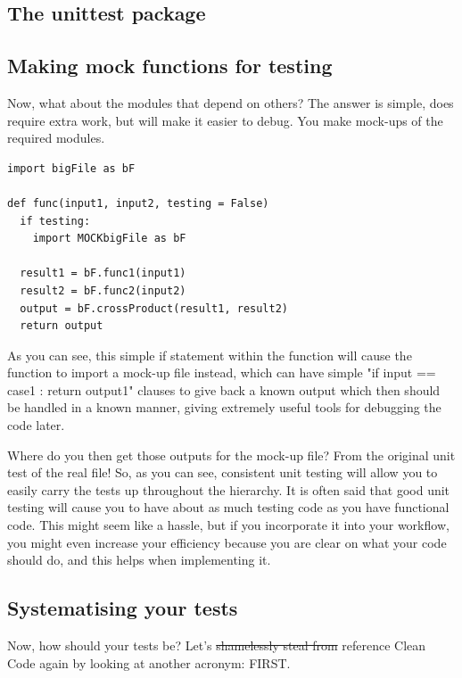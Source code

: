 \documentclass[10pt,a4paper]{article}
\begin{document}
\subsection{The unittest package}


\subsection{Making mock functions for testing}
Now, what about the modules that depend on others? The answer is simple, does require extra work, but will make it easier to debug. You make mock-ups of the required modules. 

\begin{lstlisting}
import bigFile as bF

def func(input1, input2, testing = False)
  if testing:
    import MOCKbigFile as bF
  
  result1 = bF.func1(input1)
  result2 = bF.func2(input2)
  output = bF.crossProduct(result1, result2)
  return output

\end{lstlisting}
As you can see, this simple if statement within the function will cause the function to import a mock-up file instead, which can have simple "if input == case1 : return output1" clauses to give back a known output which then should be handled in a known manner, giving extremely useful tools for debugging the code later. 

Where do you then get those outputs for the mock-up file? From the original unit test of the real file! So, as you can see, consistent unit testing will allow you to easily carry the tests up throughout the hierarchy. It is often said that good unit testing will cause you to have about as much testing code as you have functional code. This might seem like a hassle, but if you incorporate it into your workflow, you might even increase your efficiency because you are clear on what your code should do, and this helps when implementing it. 


\subsection{Systematising your tests}

Now, how should your tests be? Let's \st{shamelessly steal from} reference Clean Code again by looking at another acronym: FIRST.
\end{document}
